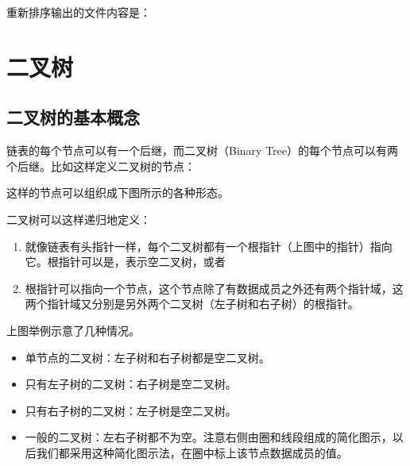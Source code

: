 

重新排序输出的文件内容是：






\section{二叉树}
%
\subsection{二叉树的基本概念}
%


链表的每个节点可以有一个后继，而二叉树（Binary Tree）的每个节点可以有两个后继。比如这样定义二叉树的节点：




这样的节点可以组织成下图所示的各种形态。




二叉树可以这样递归地定义：


\begin{enumerate}

\item 就像链表有头指针一样，每个二叉树都有一个根指针（上图中的指针）指向它。根指针可以是，表示空二叉树，或者

\item 根指针可以指向一个节点，这个节点除了有数据成员之外还有两个指针域，这两个指针域又分别是另外两个二叉树（左子树和右子树）的根指针。
\end{enumerate}


上图举例示意了几种情况。


\begin{itemize}

\item 单节点的二叉树：左子树和右子树都是空二叉树。

\item 只有左子树的二叉树：右子树是空二叉树。

\item 只有右子树的二叉树：左子树是空二叉树。

\item 一般的二叉树：左右子树都不为空。注意右侧由圈和线段组成的简化图示，以后我们都采用这种简化图示法，在圈中标上该节点数据成员的值。
\end{itemize}


